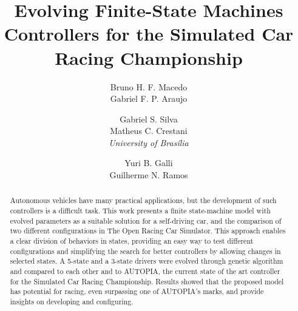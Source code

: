 \documentclass[a4paper]{sbgames}
\title{Evolving Finite-State Machines Controllers for the Simulated Car Racing Championship}
\author{Bruno H. F. Macedo\\Gabriel F. P. Araujo\\
		\and Gabriel S. Silva\\Matheus C. Crestani\\\textit{University of Bras\'{i}lia}
		\and Yuri B. Galli\\ Guilherme N. Ramos\\
}
\begin{document}
	\maketitle

	\begin{abstract}
		Autonomous vehicles have many practical applications, but the development of such controllers is a difficult task. This work presents a finite state-machine model with evolved parameters as a suitable solution for a self-driving car, and the comparison of two different configurations in The Open Racing Car Simulator. This approach enables a clear division of behaviors in states, providing an easy way to test different configurations and simplifying the search for better controllers by allowing changes in selected states. A 5-state and a 3-state drivers were evolved through genetic algorithm and compared to each other and to AUTOPIA, the current state of the art controller for the Simulated Car Racing Championship. Results showed that the proposed model has potential for racing, even surpassing one of AUTOPIA's marks, and provide insights on developing and configuring.
	\end{abstract}

	\keywordlist
	\contactlist



	
	
\end{document}
